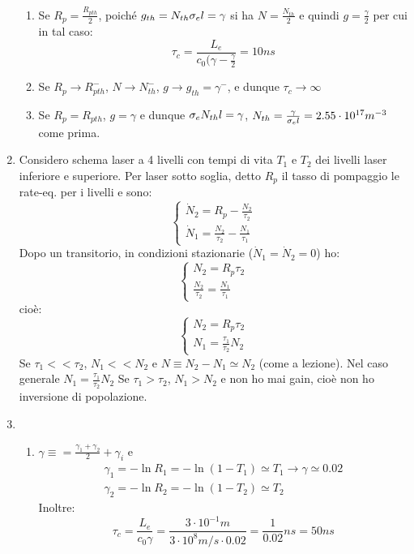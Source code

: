 \begin{enumerate}
\begin{enumerate}
\item Se $R_p = \frac{R_{p th}}{2}$, poiché $g_{th} = N_{th} \sigma_e l = \gamma$ si ha $N = \frac{N_{th}}{2}$ e quindi $g =\frac{\gamma}{2}$ per cui in tal caso:
\begin{equation*}
\tau_c = \frac{L_e}{c_0(\gamma - \frac{\gamma}{2}} = 10 ns
\end{equation*}
\item Se $R_p \rightarrow R_{p th}^-$, $N\rightarrow N_{th}^-$, $g \rightarrow g_{th} = \gamma^-$, e dunque $\tau_c \rightarrow \infty$ 
\item Se $R_p = R_{p th}$, $g = \gamma$ e dunque $\sigma_e N_{th}l=\gamma$, $N_{th}=\frac{\gamma}{\sigma_e l} = 2.55 \cdot 10^{17} m^{-3}$ come prima.
\end{enumerate}

\item Considero schema laser a 4 livelli con tempi di vita $T_1$ e $T_2$ dei livelli laser inferiore e superiore.
Per laser sotto soglia, detto $R_p$ il tasso di pompaggio le rate-eq. per i livelli  e  sono:
\begin{equation*}
\begin{cases}
\dot{N}_2 = R_p - \frac{N_2}{\tau_2}\\
\dot{N}_1 = \frac{N_2}{\tau_2} - \frac{N_1}{\tau_1}
\end{cases}
\end{equation*}
Dopo un transitorio, in condizioni stazionarie ($\dot{N}_1 = \dot{N}_2 = 0$) ho:
\begin{equation*}
\begin{cases}
N_2 = R_p\tau_2\\
\frac{N_2}{\tau_2} = \frac{N_1}{\tau_1}
\end{cases}
\end{equation*}
cioè:
\begin{equation*}
\begin{cases}
N_2 = R_p\tau_2\\
N_1 = \frac{\tau_1}{\tau_2} N_2
\end{cases}
\end{equation*}
Se $\tau_1 << \tau_2$, $N_1 << N_2$ e $N \equiv N_2 - N_1 \simeq N_2$ (come a lezione).
Nel caso generale $N_1 = \frac{\tau_1}{\tau_2} N_2$ Se $\tau_1 > \tau_2$, $N_1 > N_2$ e non ho mai gain, cioè non ho inversione di popolazione.

\item %
\begin{enumerate}
\item $\gamma \equiv = \frac{\gamma_1 + \gamma_2}{2} + \gamma_i$ e
\begin{align*}
\gamma_1 = -\ln R_1 = -\ln (1-T_1) \simeq T_1 \rightarrow \gamma \simeq 0.02\\
\gamma_2 = -\ln R_2 = -\ln (1 -T_2) \simeq T_2
\end{align*}
Inoltre:
\begin{equation*}
\tau_c = \frac{L_e}{c_0 \gamma} = \frac{3\cdot 10^{-1} m}{3 \cdot 10^8 m/s \cdot 0.02} = \frac{1}{0.02} ns = 50 ns
\end{equation*}


\end{enumerate}
\end{enumerate}
